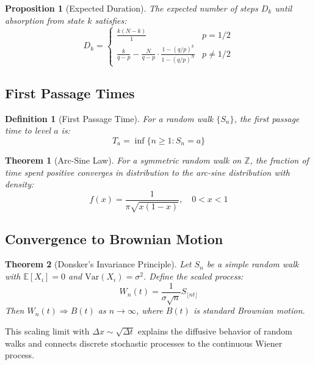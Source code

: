 \documentclass[a4paper, 11pt]{article}
\newtheorem{definition}{Definition}[section]
\newtheorem{theorem}{Theorem}[section]
\newtheorem{proposition}{Proposition}[section]
\begin{document}
\begin{proposition}[Expected Duration]
The expected number of steps $D_k$ until absorption from state $k$ satisfies:
\begin{equation}
D_k = \begin{cases}
\frac{k(N-k)}{1} & p = 1/2 \\
\frac{k}{q-p} - \frac{N}{q-p} \cdot \frac{1-(q/p)^k}{1-(q/p)^N} & p \neq 1/2
\end{cases}
\end{equation}
\end{proposition}

\subsection{First Passage Times}

\begin{definition}[First Passage Time]
For a random walk $\{S_n\}$, the first passage time to level $a$ is:
\begin{equation}
T_a = \inf\{n \geq 1 : S_n = a\}
\end{equation}
\end{definition}

\begin{theorem}[Arc-Sine Law]
For a symmetric random walk on $\mathbb{Z}$, the fraction of time spent positive converges in
distribution to the arc-sine distribution with density:
\begin{equation}
f(x) = \frac{1}{\pi\sqrt{x(1-x)}}, \quad 0 < x < 1
\end{equation}
\end{theorem}

\subsection{Convergence to Brownian Motion}

\begin{theorem}[Donsker's Invariance Principle]
Let $S_n$ be a simple random walk with $\mathbb{E}[X_i] = 0$ and $\text{Var}(X_i) = \sigma^2$.
Define the scaled process:
\begin{equation}
W_n(t) = \frac{1}{\sigma\sqrt{n}} S_{\lfloor nt \rfloor}
\end{equation}
Then $W_n(t) \Rightarrow B(t)$ as $n \to \infty$, where $B(t)$ is standard Brownian motion.
\end{theorem}

This scaling limit with $\Delta x \sim \sqrt{\Delta t}$ explains the diffusive behavior of random
walks and connects discrete stochastic processes to the continuous Wiener process.
\end{document}
